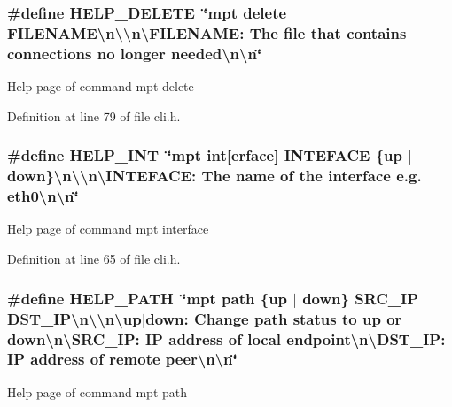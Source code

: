 \hypertarget{group___mpt_help_ga6973c6a7b80a84245dfe8292715f303f}{
\subsubsection[{H\-E\-L\-P\-\_\-\-D\-E\-L\-E\-T\-E}]{\setlength{\rightskip}{0pt plus 5cm}\#define H\-E\-L\-P\-\_\-\-D\-E\-L\-E\-T\-E~\char`\"{}mpt delete F\-I\-L\-E\-N\-A\-M\-E\textbackslash{}n\textbackslash{}\textbackslash{}n\textbackslash{}\-F\-I\-L\-E\-N\-A\-M\-E\-:   The file that contains connections no longer needed\textbackslash{}n\textbackslash{}n\char`\"{}}}\label{group___mpt_help_ga6973c6a7b80a84245dfe8292715f303f}
Help page of command mpt delete 

Definition at line 79 of file cli.\-h.

\hypertarget{group___mpt_help_gaf505be684fba1e60298c721f30b9a0d3}{
\subsubsection[{H\-E\-L\-P\-\_\-\-I\-N\-T}]{\setlength{\rightskip}{0pt plus 5cm}\#define H\-E\-L\-P\-\_\-\-I\-N\-T~\char`\"{}mpt int\mbox{[}erface\mbox{]} I\-N\-T\-E\-F\-A\-C\-E \{up $|$ down\}\textbackslash{}n\textbackslash{}\textbackslash{}n\textbackslash{}\-I\-N\-T\-E\-F\-A\-C\-E\-: The name of the interface e.\-g. eth0\textbackslash{}n\textbackslash{}n\char`\"{}}}\label{group___mpt_help_gaf505be684fba1e60298c721f30b9a0d3}
Help page of command mpt interface 

Definition at line 65 of file cli.\-h.

\hypertarget{group___mpt_help_gaef9b02af5c6695a80383b0fe32a99e7f}{
\subsubsection[{H\-E\-L\-P\-\_\-\-P\-A\-T\-H}]{\setlength{\rightskip}{0pt plus 5cm}\#define H\-E\-L\-P\-\_\-\-P\-A\-T\-H~\char`\"{}mpt path \{up $|$ down\} S\-R\-C\-\_\-\-I\-P D\-S\-T\-\_\-\-I\-P\textbackslash{}n\textbackslash{}\textbackslash{}n\textbackslash{}up$|$down\-:    Change path status to up or down\textbackslash{}n\textbackslash{}\-S\-R\-C\-\_\-\-I\-P\-:     I\-P address of local endpoint\textbackslash{}n\textbackslash{}\-D\-S\-T\-\_\-\-I\-P\-:     I\-P address of remote peer\textbackslash{}n\textbackslash{}n\char`\"{}}}\label{group___mpt_help_gaef9b02af5c6695a80383b0fe32a99e7f}
Help page of command mpt path 

